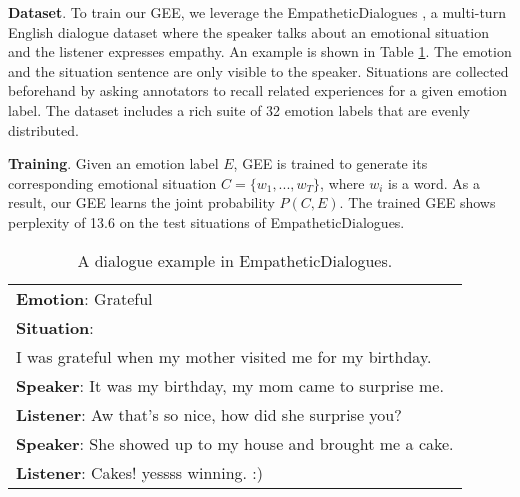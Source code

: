 \documentclass[11pt]{article}
\begin{document}
\textbf{Dataset}.
To train our GEE, we leverage the EmpatheticDialogues \citep{Rashkin:2019:ACL},
a multi-turn English dialogue dataset where the speaker talks about an emotional situation and the listener expresses empathy.
An example is shown in Table \ref{tab:ed_example}.
The emotion and the situation sentence are only visible to the speaker.
Situations are collected beforehand by asking annotators to recall related experiences for a given emotion label.
The dataset includes a rich suite of 32 emotion labels that are evenly distributed.


\textbf{Training}.
Given an emotion label $E$, GEE is trained to generate its corresponding emotional situation $C=\{w_1, ..., w_T\}$, where $w_i$ is a word.
As a result, our GEE learns the joint probability $P(C, E)$.
The trained GEE shows perplexity of 13.6 on the test situations of EmpatheticDialogues.




{\renewcommand{\arraystretch}{1.1}
    \begin{table}[t] \begin{center}
    \small
    \setlength{\tabcolsep}{1pt}
    \begin{tabularx}{\linewidth}{X}
        \toprule
        \textbf{Emotion}: Grateful \\
        \textbf{Situation}: \\
        I was grateful when my mother visited me for my birthday. \\
        \midrule
        \textbf{Speaker}: It was my birthday, my mom came to surprise me. \\
        \textbf{Listener}: Aw that's so nice, how did she surprise you? \\
        \textbf{Speaker}: She showed up to my house and brought me a cake. \\
        \textbf{Listener}: Cakes! yessss winning. :) \\
        \bottomrule
    \end{tabularx}
    \vspace{-7pt}
    \caption{A dialogue example in EmpatheticDialogues.} \label{tab:ed_example}
    \vspace{-10pt}
\end{center}\end{table}}
\end{document}

